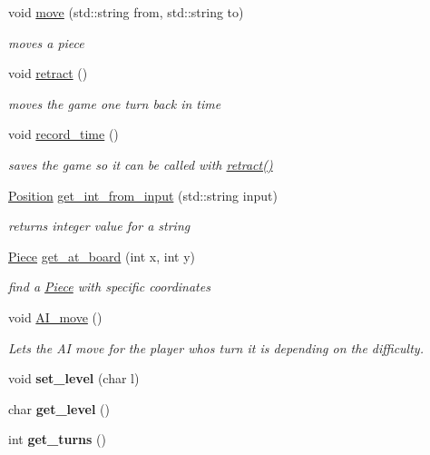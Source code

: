 \begin{DoxyCompactItemize}
void \hyperlink{class_game_a00150c33b3469c2fb95653b2f3be36b6}{move} (std\+::string from, std\+::string to)
\begin{DoxyCompactList}\small\item\em moves a piece \end{DoxyCompactList}\item 
void \hyperlink{class_game_a9be0655102af94f1a37a7eaec1be36fc}{retract} ()
\begin{DoxyCompactList}\small\item\em moves the game one turn back in time \end{DoxyCompactList}\item 
void \hyperlink{class_game_accc03cc11af1ef5614a265d2e9ed4841}{record\+\_\+time} ()
\begin{DoxyCompactList}\small\item\em saves the game so it can be called with \hyperlink{class_game_a9be0655102af94f1a37a7eaec1be36fc}{retract()} \end{DoxyCompactList}\item 
\hyperlink{struct_position}{Position} \hyperlink{class_game_a2a71f9781d47c4b7c62005bb14f6bfa3}{get\+\_\+int\+\_\+from\+\_\+input} (std\+::string input)
\begin{DoxyCompactList}\small\item\em returns integer value for a string \end{DoxyCompactList}\item 
\hyperlink{class_piece}{Piece} \hyperlink{class_game_a255e5bb1512854fd8df8cef51fab49d8}{get\+\_\+at\+\_\+board} (int x, int y)
\begin{DoxyCompactList}\small\item\em find a \hyperlink{class_piece}{Piece} with specific coordinates \end{DoxyCompactList}\item 
void \hyperlink{class_game_ac495c211545773a11948a3b3ac52bb18}{A\+I\+\_\+move} ()
\begin{DoxyCompactList}\small\item\em Lets the AI move for the player whos turn it is depending on the difficulty. \end{DoxyCompactList}\item 
\mbox{\label{class_game_aed72a88415e4978d27c72e6929264e0d}} 
void {\bfseries set\+\_\+level} (char l)
\item 
\mbox{\label{class_game_a0643486d59cd27c1089d97ecffec1c79}} 
char {\bfseries get\+\_\+level} ()
\item 
\mbox{\label{class_game_a65250bbb867f1eb8067dab620a1dfd58}} 
int {\bfseries get\+\_\+turns} ()
\end{DoxyCompactItemize}
